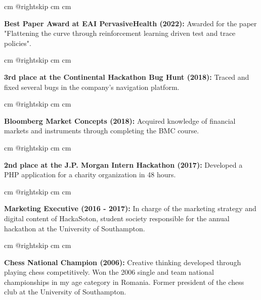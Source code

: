 \documentclass[10pt, letterpaper]{article}
\begin{document}
        \begingroup{} cm
        \advance\csname @rightskip cm
        \advance{} cm

        \textbf{Best Paper Award at EAI PervasiveHealth (2022):} Awarded for the paper "Flattening the curve through reinforcement learning driven test and trace policies". \par\endgroup

        \vspace{0.2 cm}
        \begingroup{} cm
        \advance\csname @rightskip cm
        \advance{} cm

        \textbf{3rd place at the Continental Hackathon Bug Hunt (2018):} Traced and fixed several bugs in the company's navigation platform. \par\endgroup

        \vspace{0.2 cm}
        \begingroup{} cm
        \advance\csname @rightskip cm
        \advance{} cm

        \textbf{Bloomberg Market Concepts (2018):} Acquired knowledge of financial markets and instruments through completing the BMC course. \par\endgroup

        \vspace{0.2 cm}
        \begingroup{} cm
        \advance\csname @rightskip cm
        \advance{} cm

        \textbf{2nd place at the J.P. Morgan Intern Hackathon (2017):} Developed a PHP application for a charity organization in 48 hours. \par\endgroup

        \vspace{0.2 cm}
        \begingroup{} cm
        \advance\csname @rightskip cm
        \advance{} cm

        \textbf{Marketing Executive (2016 - 2017):} In charge of the marketing strategy and digital content of HackaSoton, student society responsible for the annual hackathon at the University of Southampton. \par\endgroup

        \vspace{0.2 cm}
        \begingroup{} cm
        \advance\csname @rightskip cm
        \advance{} cm

        \textbf{Chess National Champion (2006):} Creative thinking developed through playing chess competitively. Won the 2006 single and team national championships in my age category in Romania. Former president of the chess club at the University of Southampton. \par\endgroup
\end{document}
